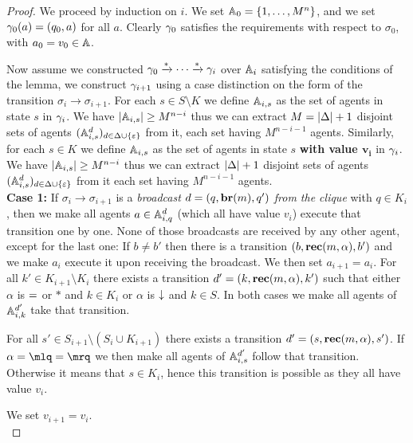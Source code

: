 \begin{proof}
	
	We proceed by induction on $i$.
	We set $\mathbb{A}_0 = \{1, \ldots, M^n\}$, and we set $\gamma_0(a) = (q_0, a)$ for all $a$. Clearly $\gamma_0$ satisfies the requirements with respect to $\sigma_0$, with $a_0 = v_0 \in \mathbb{A}$.
	
	Now assume we constructed $\gamma_0 \xrightarrow{*} \cdots \xrightarrow{*} \gamma_{i}$ over $\mathbb{A}_i$ satisfying the conditions of the lemma, we construct $\gamma_{i+1}$ using a case distinction on the form of the transition $\sigma_i \to \sigma_{i+1}$.
	For each $s \in S\setminus K$ we define $\mathbb{A}_{i,s}$ as the set of agents in state $s$ in $\gamma_{i}$. We have $|\mathbb{A}_{i,s}| \geq M^{n-i}$ thus we can extract $M = |\Delta|+1$ disjoint sets of agents $(\mathbb{A}_{i,s}^d)_{d \in \Delta\cup\{\varepsilon\}}$ from it, each set having $M^{n-i-1}$ agents.
	Similarly, for each $s \in K$ we define $\mathbb{A}_{i,s}$ as the set of agents in state $s$ \textbf{with value $\mathbf{v_i}$} in $\gamma_{i}$. We have $|\mathbb{A}_{i,s}| \geq M^{n-i}$ thus we can extract $|\Delta|+1$ disjoint sets of agents $(\mathbb{A}_{i,s}^d)_{d \in \Delta\cup\{\varepsilon\}}$ from it each set having $M^{n-i-1}$ agents.
	\\
	
	\textbf{Case 1: } If $\sigma_i \to \sigma_{i+1}$ is a \emph{broadcast $d = (q, \textbf{br}(m), q')$ from the clique} with $q \in K_i$, then we make all agents $a \in \mathbb{A}_{i,q}^{d}$ (which all have value $v_i$) execute that transition one by one.
	None of those broadcasts are received by any other agent, except for the last one:
	If $b \neq b'$ then there is a transition $(b, \textbf{rec}(m, \alpha), b')$ and we make $a_i$ execute it upon receiving the broadcast. We then set $a_{i+1} = a_i$.
	For all $k' \in K_{i+1} \setminus K_i$ there exists a transition $d'=(k, \textbf{rec}(m, \alpha), k')$ such that either $\alpha$ is ${=}$ or $*$ and $k \in K_i$ or $\alpha$ is $\downarrow$ and $k\in S$.
	In both cases we make all agents of $\mathbb{A}_{i,k}^{d'}$ take that transition.
	
	For all $s' \in S_{i+1} \setminus (S_i \cup K_{i+1})$ there exists a transition $d'=(s,\textbf{rec}(m, \alpha),s')$. If $\alpha = \quotemarks{=}$ we then make all agents of $\mathbb{A}_{i,s}^{d'}$ follow that transition. Otherwise it means that $s \in K_i$, hence this transition is possible as they all have value $v_i$.
	
	We set $v_{i+1} = v_i$.
	\\
	

\end{proof}

